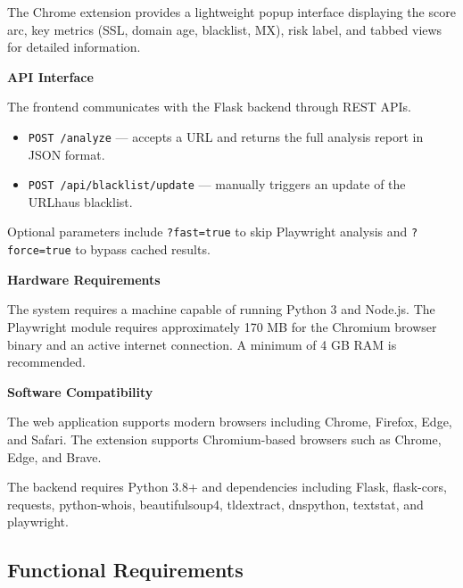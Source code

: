 The Chrome extension provides a lightweight popup interface displaying the score arc, key metrics (SSL, domain age, blacklist, MX), risk label, and tabbed views for detailed information.

\textbf{API Interface}

The frontend communicates with the Flask backend through REST APIs.

\begin{itemize}
\item \texttt{POST /analyze} — accepts a URL and returns the full analysis report in JSON format.
\item \texttt{POST /api/blacklist/update} — manually triggers an update of the URLhaus blacklist.
\end{itemize}

Optional parameters include \texttt{?fast=true} to skip Playwright analysis and \texttt{?force=true} to bypass cached results.

\textbf{Hardware Requirements}

The system requires a machine capable of running Python 3 and Node.js. The Playwright module requires approximately 170 MB for the Chromium browser binary and an active internet connection. A minimum of 4 GB RAM is recommended.

\textbf{Software Compatibility}

The web application supports modern browsers including Chrome, Firefox, Edge, and Safari. The extension supports Chromium-based browsers such as Chrome, Edge, and Brave.

The backend requires Python 3.8+ and dependencies including Flask, flask-cors, requests, python-whois, beautifulsoup4, tldextract, dnspython, textstat, and playwright.

\subsection{Functional Requirements}

